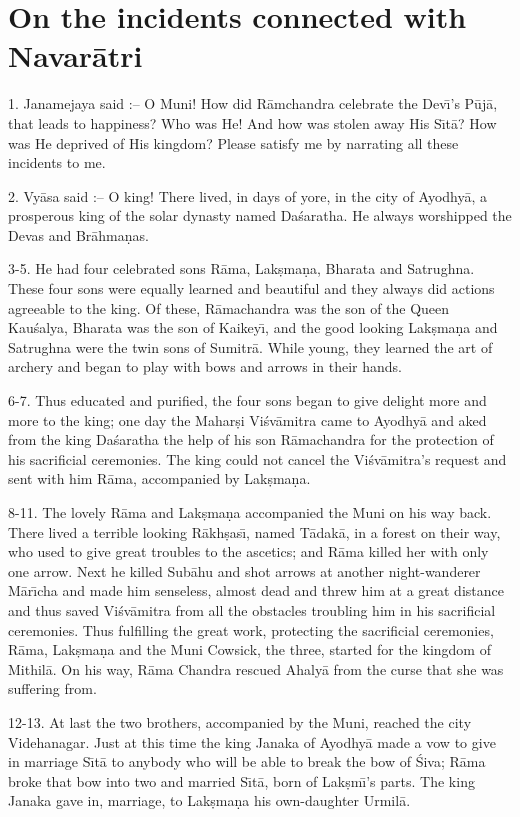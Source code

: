 \chapter{On the incidents connected with Navar\=atri}

1. Janamejaya said :-- O Muni! How did R\=amchandra celebrate the Dev\={\i}'s P\=uj\=a, that leads to happiness? Who was He! And how was stolen away His S\={\i}t\=a? How was He deprived of His kingdom? Please satisfy me by narrating all these incidents to me.

2. Vy\=asa said :-- O king! There lived, in days of yore, in the city of Ayodhy\=a, a prosperous king of the solar dynasty named Da\'saratha. He always worshipped the Devas and Br\=ahma\d{n}as.

3-5. He had four celebrated sons R\=ama, Lak\d{s}ma\d{n}a, Bharata and Satrughna. These four sons were equally learned and beautiful and they always did actions agreeable to the king. Of these, R\=amachandra was the son of the Queen Kau\'salya, Bharata was the son of Kaikey\={\i}, and the good looking Lak\d{s}ma\d{n}a and Satrughna were the twin sons of Sumitr\=a. While young, they learned the art of archery and began to play with bows and arrows in their hands.

6-7. Thus educated and purified, the four sons began to give delight more and more to the king; one day the Mahar\d{s}i Vi\'sv\=amitra came to Ayodhy\=a and aked from the king Da\'saratha the help of his son R\=amachandra for the protection of his sacrificial ceremonies. The king could not cancel the Vi\'sv\=amitra's request and sent with him R\=ama, accompanied by Lak\d{s}ma\d{n}a.

8-11. The lovely R\=ama and Lak\d{s}ma\d{n}a accompanied the Muni on his way back. There lived a terrible looking R\=akh\d{s}as\={\i}, named T\=adak\=a, in a forest on their way, who used to give great troubles to the ascetics; and R\=ama killed her with only one arrow. Next he killed Sub\=ahu and shot arrows at another night-wanderer M\=ar\={\i}cha and made him senseless, almost dead and threw him at a great distance and thus saved Vi\'sv\=amitra from all the obstacles troubling him in his sacrificial ceremonies. Thus fulfilling the great work, protecting the sacrificial ceremonies, R\=ama, Lak\d{s}ma\d{n}a and the Muni Cowsick, the three, started for the kingdom of Mithil\=a. On his way, R\=ama Chandra rescued Ahaly\=a from the curse that she was suffering from.

12-13. At last the two brothers, accompanied by the Muni, reached the city Videhanagar. Just at this time the king Janaka of Ayodhy\=a made a vow to give in marriage S\={\i}t\=a to anybody who will be able to break the bow of \'Siva; R\=ama broke that bow into two and married S\={\i}t\=a, born of Lak\d{s}m\={\i}'s parts. The king Janaka gave in, marriage, to Lak\d{s}ma\d{n}a his own-daughter Urmil\=a.


